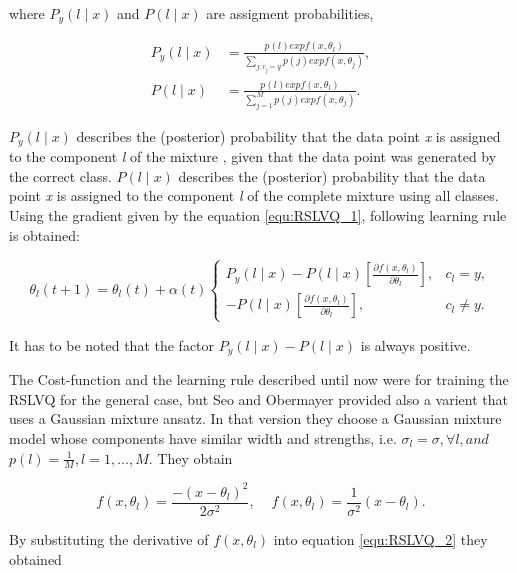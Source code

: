 \documentclass[12pt,oneside,a4paper,parskip]{scrbook}
\begin{document}
where $P_y(l\mid x)$ and $P(l\mid x)$ are assigment probabilities,

\begin{equation}
  \begin{split}
    P_y(l\mid x) &= \frac{p(l) exp f(x, \theta_l)}{\displaystyle\sum_{j:c_j = y}p(j) exp f(x, \theta_j)}, \\
    P(l\mid x) &= \frac{p(l) exp f(x, \theta_l)}{\displaystyle\sum_{j=1}^{M}p(j) exp f(x, \theta_j)}.
  \end{split}
\end{equation}

$P_y(l\mid x)$ describes the (posterior) probability that the data point \textit{x} is assigned to the component \textit{l} of the mixture
, given that the data point was generated by the correct class. $P(l\mid x)$ describes the (posterior) probability that the 
data point \textit{x} is assigned to the component \textit{l} of the complete mixture using all classes.
Using the gradient given by the equation \ref{equ:RSLVQ_1}, following learning rule is obtained: 

\begin{equation}
  \theta_l(t + 1) = \theta_l(t) + \alpha(t) 
  \begin{cases}
    P_y(l\mid x) - P(l\mid x)[\frac{\partial f(x, \theta_l) }{\partial\theta_l}], &c_l = y,  \\
    - P(l\mid x)[\frac{\partial f(x, \theta_l) }{\partial\theta_l}],              &c_l \neq y.              
  \end{cases}
  \label{equ:RSLVQ_2}
\end{equation}

It has to be noted that the factor $P_y(l\mid x) - P(l\mid x)$ is always positive. \cite{RSLVQOrig}

The Cost-function and the learning rule described until now were for training the RSLVQ for the general case, but 
Seo and Obermayer provided also a varient that uses a Gaussian mixture ansatz.
In that version they choose a Gaussian mixture model whose components have similar width and strengths, i.e.
$\sigma_l = \sigma, \forall l, and$ $p(l) = \frac{1}{M}, l = 1, ..., M$. They obtain 

\begin{equation}
  f(x,\theta_l) = \frac{-(x-\theta_l)^2}{2\sigma^2},   \quad   \frac{}{}f(x,\theta_l) = \frac{1}{\sigma^2}(x-\theta_l).
\end{equation}

By substituting the derivative of $f(x,\theta_l)$ into equation \ref{equ:RSLVQ_2} they obtained
\end{document}
